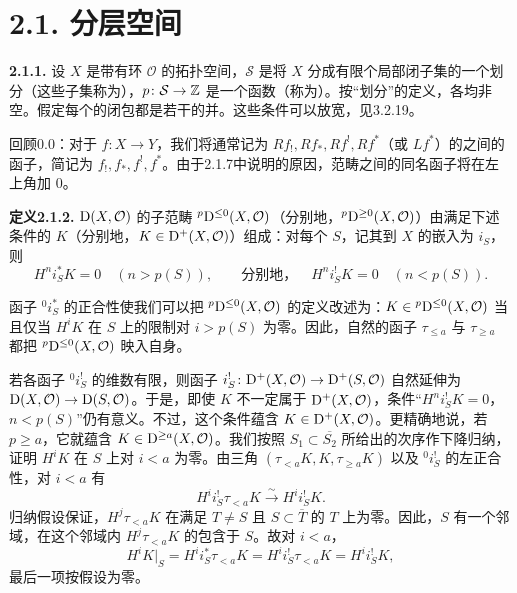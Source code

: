 \section*{2.1. 分层空间}

\par\medskip\noindent\textbf{2.1.1.} 设 $X$ 是带有环 $\mathcal O$ 的拓扑空间，$\mathcal S$ 是将 $X$ 分成有限个局部闭子集的一个划分（这些子集称为），$p\colon\mathcal S\to\mathbb Z$ 是一个函数（称为）。按“划分”的定义，各均非空。假定每个的闭包都是若干的并。这些条件可以放宽，见3.2.19。

回顾0.0：对于 $f\colon X\to Y$，我们将通常记为 $Rf_!,Rf_*,Rf^!,Rf^*$（或 $Lf^*$）的之间的函子，简记为 $f_!,f_*,f^!,f^*$。由于2.1.7中说明的原因，范畴之间的同名函子将在左上角加 $0$。

\par\medskip\noindent\textbf{定义2.1.2.} $\mathrm{D}(X,\mathcal O)$ 的子范畴 ${}^p\mathrm{D}^{\leq0}(X,\mathcal O)$（分别地，${}^p\mathrm{D}^{\geq0}(X,\mathcal O)$）由满足下述条件的 $K$（分别地，$K\in\mathrm{D}^+(X,\mathcal O)$）组成：对每个 $S$，记其到 $X$ 的嵌入为 $i_S$，则
\[
 H^ni_S^*K=0\quad(n>p(S)),\qquad
 \text{分别地，}\quad H^ni_S^!K=0\quad(n<p(S)).
\]

函子 ${}^0i_S^*$ 的正合性使我们可以把 ${}^p\mathrm{D}^{\leq0}(X,\mathcal O)$ 的定义改述为：$K\in{}^p\mathrm{D}^{\leq0}(X,\mathcal O)$ 当且仅当 $H^iK$ 在 $S$ 上的限制对 $i>p(S)$ 为零。因此，自然的函子 $\tau_{\leq a}$ 与 $\tau_{\geq a}$ 都把 ${}^p\mathrm{D}^{\leq0}(X,\mathcal O)$ 映入自身。

若各函子 ${}^0i_S^!$ 的维数有限，则函子 $i_S^!\colon\mathrm{D}^+(X,\mathcal O)\to\mathrm{D}^+(S,\mathcal O)$ 自然延伸为 $\mathrm{D}(X,\mathcal O)\to\mathrm{D}(S,\mathcal O)$。于是，即使 $K$ 不一定属于 $\mathrm{D}^+(X,\mathcal O)$，条件“$H^ni_S^!K=0$，$n<p(S)$”仍有意义。不过，这个条件蕴含 $K\in\mathrm{D}^+(X,\mathcal O)$。更精确地说，若 $p\geq a$，它就蕴含 $K\in\mathrm{D}^{\geq a}(X,\mathcal O)$。我们按照 $S_1\subset\overline{S_2}$ 所给出的次序作下降归纳，证明 $H^iK$ 在 $S$ 上对 $i<a$ 为零。由三角 $(\tau_{<a}K,K,\tau_{\geq a}K)$ 以及 ${}^0i_S^!$ 的左正合性，对 $i<a$ 有
\[
 H^ii_S^!\tau_{<a}K\xrightarrow{\sim}H^ii_S^!K.
\]
归纳假设保证，$H^j\tau_{<a}K$ 在满足 $T\ne S$ 且 $S\subset\overline T$ 的 $T$ 上为零。因此，$S$ 有一个邻域，在这个邻域内 $H^j\tau_{<a}K$ 的包含于 $S$。故对 $i<a$，
\[
 H^iK|_S=H^ii_S^*\tau_{<a}K
 =H^ii_S^!\tau_{<a}K=H^ii_S^!K,
\]
最后一项按假设为零。

